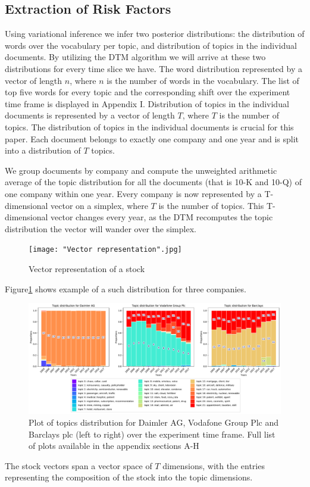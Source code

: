 \documentclass[12pt,journal,letterpaper,oneside,onecolumn]{IEEEtran}
\begin{document}
\subsection{Extraction of Risk Factors}
Using variational inference we infer two posterior distributions: the distribution of words over the vocabulary per topic, and distribution of topics in the individual documents. By utilizing the DTM algorithm we will arrive at these two distributions for every time slice we have.
The word distribution represented by a vector of length $n$, where $n$ is the number of words in the vocabulary. The list of top five words for every topic and the corresponding shift over the experiment time frame is displayed in Appendix I. 
Distribution of topics in the individual documents is represented by a vector of length $T$, where $T$ is the number of topics. The distribution of topics in the individual documents is crucial for this paper. Each document belongs to exactly one company and one year and is split into a distribution of $T$ topics.

We group documents by company and compute the unweighted arithmetic average of the topic distribution for all the documents (that is 10-K and 10-Q) of one company within one year. Every company is now represented by a T-dimensional vector on a simplex, where $T$ is the number of topics. This T-dimensional vector changes every year, as the DTM recomputes the topic distribution  the vector will wander over the simplex.

\begin{figure}[htp]
    \centering
    \texttt{[image: "Vector representation".jpg]}
    \caption{Vector representation of a stock}
\end{figure}


Figure\ref{fig:3-companies-topics-distribution} shows example of a such distribution for three companies.

\begin{figure}
    \centering
	\includegraphics[width=\linewidth]{images/3_companies.pdf}
	\caption{Plot of topics distribution for Daimler AG, Vodafone Group Plc and Barclays plc (left to right) over the experiment time frame. Full list of plots available in the appendix sections A-H}
	\label{fig:3-companies-topics-distribution}       
\end{figure}
The stock vectors span a vector space of $T$ dimensions, with the entries representing the composition of the stock into the topic dimensions.
\end{document}
